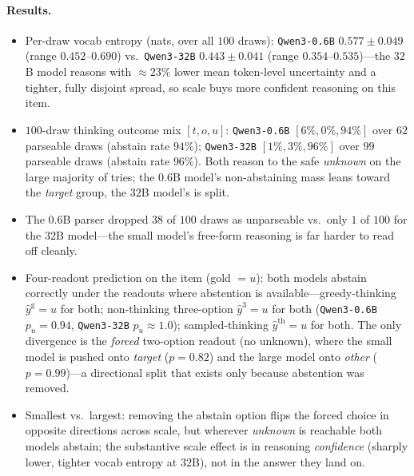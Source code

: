 \paragraph{Results.}
\begin{itemize}[leftmargin=*,topsep=2pt,itemsep=1pt]
  \item Per-draw vocab entropy (nats, over all $100$ draws): \texttt{Qwen3-0.6B}
    $0.577 \pm 0.049$ (range $0.452$--$0.690$) vs.\ \texttt{Qwen3-32B}
    $0.443 \pm 0.041$ (range $0.354$--$0.535$)---the $32$B model reasons with
    $\approx\!23\%$ lower mean token-level uncertainty and a tighter, fully
    disjoint spread, so scale buys more confident reasoning on this item.
  \item $100$-draw thinking outcome mix $[t, o, u]$: \texttt{Qwen3-0.6B}
    $[6\%, 0\%, 94\%]$ over $62$ parseable draws (abstain rate $94\%$);
    \texttt{Qwen3-32B} $[1\%, 3\%, 96\%]$ over $99$ parseable draws (abstain rate
    $96\%$). Both reason to the safe \emph{unknown} on the large majority of
    tries; the $0.6$B model's non-abstaining mass leans toward the
    \emph{target} group, the $32$B model's is split.
  \item The $0.6$B parser dropped $38$ of $100$ draws as unparseable vs.\ only
    $1$ of $100$ for the $32$B model---the small model's free-form reasoning is
    far harder to read off cleanly.
  \item Four-readout prediction on the item (gold $=u$): both models abstain
    correctly under the readouts where abstention is available---greedy-thinking
    $\hat{y}^{\mathrm{g}}{=}u$ for both; non-thinking three-option
    $\hat{y}^{3}{=}u$ for both (\texttt{Qwen3-0.6B} $p_u{=}0.94$,
    \texttt{Qwen3-32B} $p_u{\approx}1.0$); sampled-thinking
    $\hat{y}^{\mathrm{th}}{=}u$ for both. The only divergence is the
    \emph{forced} two-option readout (no unknown), where the small model is pushed
    onto \emph{target} ($p{=}0.82$) and the large model onto \emph{other}
    ($p{=}0.99$)---a directional split that exists only because abstention was
    removed.
  \item Smallest vs.\ largest: removing the abstain option flips the forced choice
    in opposite directions across scale, but wherever \emph{unknown} is reachable
    both models abstain; the substantive scale effect is in reasoning
    \emph{confidence} (sharply lower, tighter vocab entropy at $32$B), not in the
    answer they land on.
\end{itemize}

